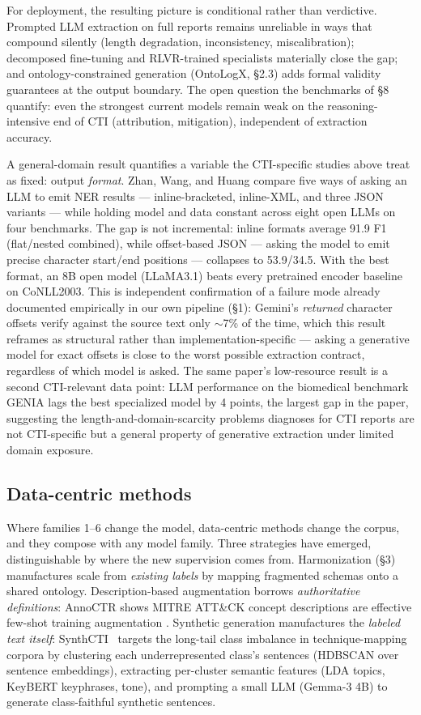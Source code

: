 \documentclass[11pt]{article}
\begin{document}
For deployment, the resulting picture is conditional rather than verdictive. Prompted LLM extraction on full reports remains unreliable in ways that compound silently (length degradation, inconsistency, miscalibration); decomposed fine-tuning and RLVR-trained specialists materially close the gap; and ontology-constrained generation (OntoLogX, §2.3) adds formal validity guarantees at the output boundary. The open question the benchmarks of §8 quantify: even the strongest current models remain weak on the reasoning-intensive end of CTI (attribution, mitigation), independent of extraction accuracy.

A general-domain result quantifies a variable the CTI-specific studies above treat as fixed: output \emph{format}. Zhan, Wang, and Huang compare five ways of asking an LLM to emit NER results — inline-bracketed, inline-XML, and three JSON variants — while holding model and data constant across eight open LLMs on four benchmarks. The gap is not incremental: inline formats average 91.9 F1 (flat/nested combined), while offset-based JSON — asking the model to emit precise character start/end positions — collapses to 53.9/34.5. With the best format, an 8B open model (LLaMA3.1) beats every pretrained encoder baseline on CoNLL2003. This is independent confirmation of a failure mode already documented empirically in our own pipeline (§1): Gemini's \emph{returned} character offsets verify against the source text only $\sim$7\% of the time, which this result reframes as structural rather than implementation-specific — asking a generative model for exact offsets is close to the worst possible extraction contract, regardless of which model is asked. The same paper's low-resource result is a second CTI-relevant data point: LLM performance on the biomedical benchmark GENIA lags the best specialized model by 4 points, the largest gap in the paper, suggesting the length-and-domain-scarcity problems \citet{mezzi2025large} diagnoses for CTI reports are not CTI-specific but a general property of generative extraction under limited domain exposure.

\subsection{Data-centric methods}

Where families 1–6 change the model, data-centric methods change the corpus, and they compose with any model family. Three strategies have emerged, distinguishable by where the new supervision comes from. Harmonization (§3) manufactures scale from \emph{existing labels} by mapping fragmented schemas onto a shared ontology. Description-based augmentation borrows \emph{authoritative definitions}: AnnoCTR shows MITRE ATT\&CK concept descriptions are effective few-shot training augmentation \citep{lange2024annoctr}. Synthetic generation manufactures the \emph{labeled text itself}: SynthCTI~\citep{ruizrdenas2025synthcti} targets the long-tail class imbalance in technique-mapping corpora by clustering each underrepresented class's sentences (HDBSCAN over sentence embeddings), extracting per-cluster semantic features (LDA topics, KeyBERT keyphrases, tone), and prompting a small LLM (Gemma-3 4B) to generate class-faithful synthetic sentences.
\end{document}
